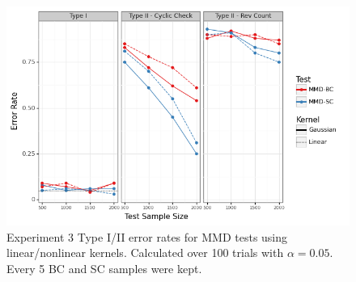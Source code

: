 \documentclass[a4paper,11pt]{article}
\begin{document}
\begin{figure}[H]
    \centering
    \includegraphics[width=\textwidth]{figures/graph_kernel.png}
    \caption{Experiment 3 Type I/II error rates for MMD tests using linear/nonlinear kernels. Calculated over 100 trials with $\alpha=0.05$. Every 5 BC and SC samples were kept.}
    \label{fig:ex3_kernel}
\end{figure}
\end{document}
